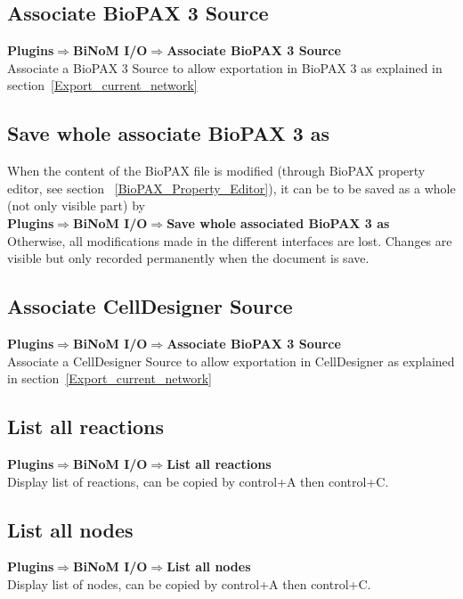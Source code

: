 \subsection{Associate BioPAX 3 Source} \label{Associate_BioPAX_Source}
\textbf{Plugins$\Rightarrow$BiNoM I/O$\Rightarrow$Associate BioPAX 3 Source}\\
Associate a BioPAX 3 Source to allow exportation in BioPAX 3 as explained in section~\ref{Export_current_network}

\subsection{Save whole associate BioPAX 3 as}
When the content of the BioPAX file is modified (through BioPAX property editor, see section ~\ref{BioPAX_Property_Editor}), it can be to be saved as a whole (not only visible part) by\\
\textbf{Plugins$\Rightarrow$BiNoM I/O$\Rightarrow$Save whole associated BioPAX 3 as}\\
Otherwise, all modifications made in the different interfaces are lost. Changes are visible but only recorded permanently when the document is save.

\subsection{Associate CellDesigner Source}\label{Associate_CellDesigner_Source}
\textbf{Plugins$\Rightarrow$BiNoM I/O$\Rightarrow$Associate BioPAX 3 Source} \\
Associate a CellDesigner Source to allow exportation in CellDesigner as explained in section~\ref{Export_current_network}

\subsection{List all reactions}
\textbf{Plugins$\Rightarrow$BiNoM I/O$\Rightarrow$List all reactions} \\
Display list of reactions, can be copied by control+A then control+C.

\subsection{List all nodes}
\textbf{Plugins$\Rightarrow$BiNoM I/O$\Rightarrow$List all nodes} \\
Display list of nodes, can be copied by control+A then control+C.

